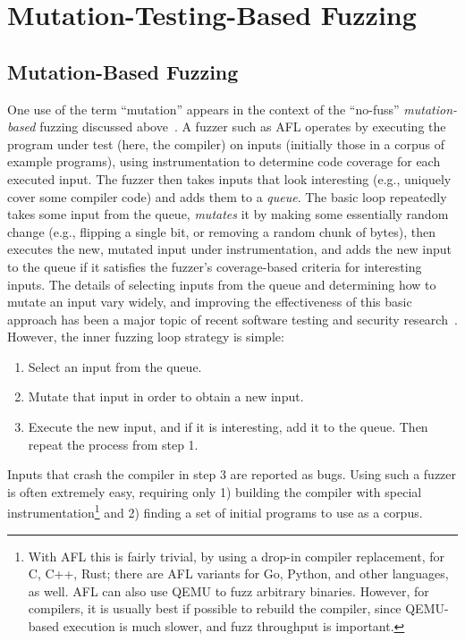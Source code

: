 \section{Mutation-Testing-Based Fuzzing}



\subsection{Mutation-Based Fuzzing}

One use of the term ``mutation'' appears in the context of the ``no-fuss'' \emph{mutation-based} fuzzing discussed above~\cite{ArtFuzz}.  A fuzzer such as AFL operates by executing the program under test (here, the compiler) on inputs (initially those in a corpus of example programs), using instrumentation to determine code coverage for each executed input.  The fuzzer then takes inputs that look interesting (e.g., uniquely cover some compiler code) and adds them to a \emph{queue}.  The basic loop repeatedly takes some input from the queue, \emph{mutates} it by making some essentially random change (e.g., flipping a single bit, or removing a random chunk of bytes), then executes the new, mutated input under instrumentation, and adds the new input to the queue if it satisfies the fuzzer's coverage-based criteria for interesting inputs.  The details of selecting inputs from the queue and determining how to mutate an input vary widely, and improving the effectiveness of this basic approach has been a major topic of recent software testing and security research~\cite{evalfuzz,BoehmeCR21,ArtFuzz}.  However, the inner fuzzing loop strategy is simple:

\begin{enumerate}
\item Select an input from the queue.
\item Mutate that input in order to obtain a new input.
\item Execute the new input, and if it is interesting, add it to the queue. Then repeat the process from step 1.
\end{enumerate}

Inputs that crash the compiler in step 3 are reported as bugs.  Using such a fuzzer is often extremely easy, requiring only 1) building the compiler with special instrumentation\footnote{With AFL this is fairly trivial, by using a drop-in compiler replacement, for C, C++, Rust; there are AFL variants for Go, Python, and other languages, as well.  AFL can also use QEMU to fuzz arbitrary binaries.  However, for compilers, it is usually best if possible to rebuild the compiler, since QEMU-based execution is much slower, and fuzz throughput is important.} and 2) finding a set of initial programs to use as a corpus.  


